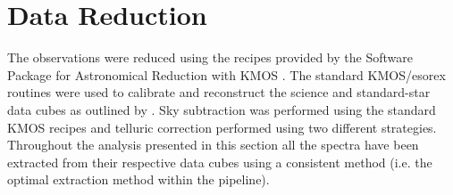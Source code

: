 \documentclass[iop]{emulateapj}
\begin{document}




\section{Data Reduction} %
\label{sec:data_reduction}

The observations were reduced using the recipes provided by the Software Package for Astronomical Reduction with KMOS
\citep[SPARK;][]{2013A&A...558A..56D}.
The standard KMOS/esorex routines were used to calibrate and reconstruct the science and standard-star data cubes as outlined by
\cite{2013A&A...558A..56D}.
Sky subtraction was performed using the standard KMOS recipes and telluric correction performed using two different strategies.
Throughout the analysis presented in this section all the spectra have been extracted from their respective data cubes using a consistent method (i.e. the optimal extraction method within the pipeline).
\end{document}
